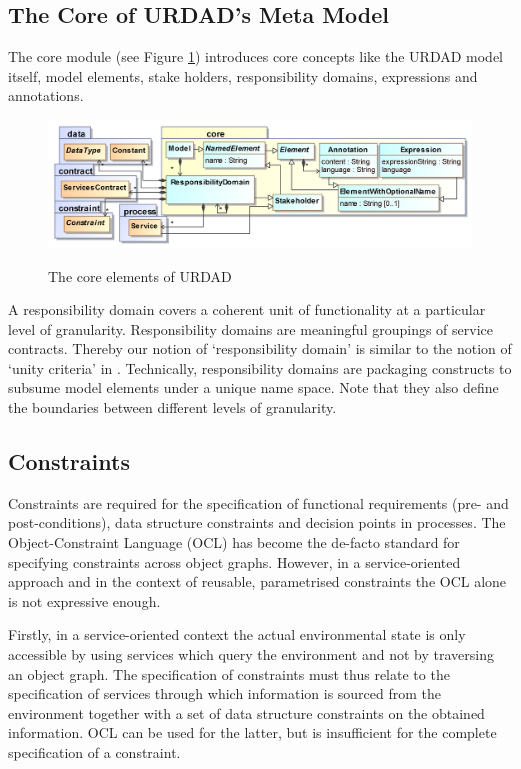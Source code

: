 \subsection{The Core of URDAD's Meta Model}

The core module (see Figure \ref{fig:coreModule}) introduces core concepts like the URDAD model itself, model elements, stake holders, responsibility domains, expressions and annotations.
\begin{figure}[thb]
  \centering
  \includegraphics[width=\pagewidth]{core}\\   
  \caption{The core elements of URDAD}
  \label{fig:coreModule}
\end{figure}

A responsibility domain covers a coherent unit of functionality at a particular level of granularity. Responsibility domains are meaningful groupings of service contracts. Thereby our notion of `responsibility domain' is similar to the notion of `unity criteria' in \cite{gonzalez_unity_2009}. Technically, responsibility domains are packaging constructs to subsume model elements under a unique name space. Note that they also define the boundaries between different levels of granularity. 

\subsection{Constraints}

Constraints are required for the specification of functional requirements (pre- and post-conditions), data structure constraints and decision points in processes. The Object-Constraint Language (OCL) has become the de-facto standard for specifying constraints across object graphs. However, in a service-oriented approach and in the context of reusable, parametrised constraints the OCL alone is not expressive enough. 

Firstly, in a service-oriented context the actual environmental state is only accessible by using services which query the environment and not by traversing an object graph. The specification of constraints must thus relate to the specification of services through which information is sourced from the environment together with a set of data structure constraints on the obtained information. OCL can be used for the latter, but is insufficient for the complete specification of a constraint.

